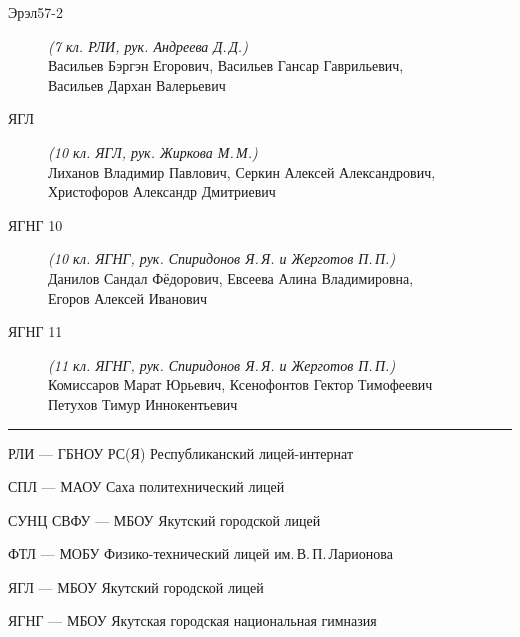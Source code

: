 \begin{description}
\item[Эрэл57-2] \textit{(7 кл. РЛИ, рук. Андреева Д.\,Д.)} \\
Васильев Бэргэн Егорович, Васильев Гансар Гаврильевич, \\
Васильев Дархан Валерьевич

\item[ЯГЛ] \textit{(10 кл. ЯГЛ, рук. Жиркова М.\,М.)} \\
Лиханов Владимир Павлович, Серкин Алексей Александрович, \\
Христофоров Александр Дмитриевич

\item[ЯГНГ 10] \textit{(10 кл. ЯГНГ, рук. Спиридонов Я.\,Я. и Жерготов П.\,П.)} \\
Данилов Сандал Фёдорович, Евсеева Алина Владимировна, \\
Егоров Алексей Иванович

\item[ЯГНГ 11] \textit{(11 кл. ЯГНГ, рук. Спиридонов Я.\,Я. и Жерготов П.\,П.)} \\
Комиссаров Марат Юрьевич, Ксенофонтов Гектор Тимофеевич \\
Петухов Тимур Иннокентьевич

\end{description}

\noindent\rule{3cm}{0.4pt}

\noindent РЛИ --- ГБНОУ РС(Я) Республиканский лицей-интернат

\noindent СПЛ --- МАОУ Саха политехнический лицей

\noindent СУНЦ СВФУ --- МБОУ Якутский городской лицей

\noindent ФТЛ --- МОБУ Физико-технический лицей им.\,В.\,П.\,Ларионова

\noindent ЯГЛ --- МБОУ Якутский городской лицей

\noindent ЯГНГ --- МБОУ Якутская городская национальная гимназия
